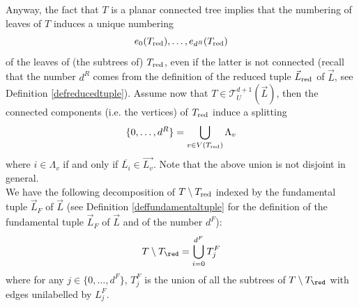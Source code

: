 Anyway, the fact that $T$ is a planar connected tree implies that the numbering of leaves of $T$ induces a unique numbering $$e_0(T_\textnormal{red}),\ldots,e_{d^R}(T_\textnormal{red})$$ of the leaves of (the subtrees of) $T_\textnormal{red}$, even if the latter is not connected (recall that the number $d^R$ comes from the definition of the reduced tuple $\vec{L}_\textnormal{red}$ of $\vec{L}$, see Definition \ref{defreducedtuple}). Assume now that $T\in \mathcal{T}_U^{d+1}(\vec{L})$, then  the connected components (i.e. the vertices) of $T_\textnormal{red}$ induce a splitting $$\{0,\ldots,d^R\}=\bigcup_{v\in V(T_\textnormal{red})}\Lambda_v$$ where $i\in \Lambda_v$ \label{Lambdav}  if and only if $\overline{L_i}\in \vec{L_v}$. Note that the above union is not disjoint in general. \\
We have the following decomposition of $T\setminus T_\textnormal{red}$ indexed by the fundamental tuple $\vec{L}_F$ \label{fundamentaldecomposition}of $\vec{L}$ (see Definition \ref{deffundamentaltuple} for the definition of the fundamental tuple $\vec{L}_F$ of $\vec{L}$ and of the number $d^F$): $$T\setminus T_\red = \bigcup_{i=0}^{d^F} T_j^F$$ where for any $j\in \{0,\ldots, d^F\}$, $T_j^F$ is the union of all the subtrees of $T\setminus T_\red$ with edges unilabelled by $L_j^F$.


